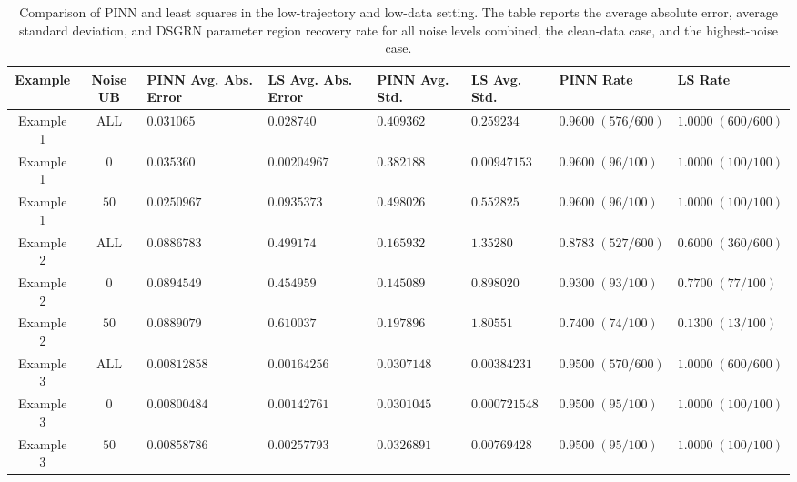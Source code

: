 \documentclass[11pt]{article}
\begin{document}
\begin{table}[H]
\centering
\scriptsize
\renewcommand{\arraystretch}{1.20}
\setlength{\tabcolsep}{3pt}
\begin{tabularx}{\textwidth}{|c|c|
>{\centering\arraybackslash}X|
>{\centering\arraybackslash}X|
>{\centering\arraybackslash}X|
>{\centering\arraybackslash}X|
>{\centering\arraybackslash}X|
>{\centering\arraybackslash}X|}
\hline
\textbf{Example} &
\textbf{Noise UB} &
\textbf{PINN Avg. Abs. Error} &
\textbf{LS Avg. Abs. Error} &
\textbf{PINN Avg. Std.} &
\textbf{LS Avg. Std.} &
\textbf{PINN Rate} &
\textbf{LS Rate} \\
\hline

Example 1 & ALL
& \(0.031065\) & \(0.028740\)
& \(0.409362\) & \(0.259234\)
& \(0.9600\; (576/600)\) & \(1.0000\; (600/600)\) \\
\hline
Example 1 & \(0\)
& \(0.035360\) & \(0.00204967\)
& \(0.382188\) & \(0.00947153\)
& \(0.9600\; (96/100)\) & \(1.0000\; (100/100)\) \\
\hline
Example 1 & \(50\)
& \(0.0250967\) & \(0.0935373\)
& \(0.498026\) & \(0.552825\)
& \(0.9600\; (96/100)\) & \(1.0000\; (100/100)\) \\
\hline

Example 2 & ALL
& \(0.0886783\) & \(0.499174\)
& \(0.165932\) & \(1.35280\)
& \(0.8783\; (527/600)\) & \(0.6000\; (360/600)\) \\
\hline
Example 2 & \(0\)
& \(0.0894549\) & \(0.454959\)
& \(0.145089\) & \(0.898020\)
& \(0.9300\; (93/100)\) & \(0.7700\; (77/100)\) \\
\hline
Example 2 & \(50\)
& \(0.0889079\) & \(0.610037\)
& \(0.197896\) & \(1.80551\)
& \(0.7400\; (74/100)\) & \(0.1300\; (13/100)\) \\
\hline

Example 3 & ALL
& \(0.00812858\) & \(0.00164256\)
& \(0.0307148\) & \(0.00384231\)
& \(0.9500\; (570/600)\) & \(1.0000\; (600/600)\) \\
\hline
Example 3 & \(0\)
& \(0.00800484\) & \(0.00142761\)
& \(0.0301045\) & \(0.000721548\)
& \(0.9500\; (95/100)\) & \(1.0000\; (100/100)\) \\
\hline
Example 3 & \(50\)
& \(0.00858786\) & \(0.00257793\)
& \(0.0326891\) & \(0.00769428\)
& \(0.9500\; (95/100)\) & \(1.0000\; (100/100)\) \\
\hline

\end{tabularx}
\caption{Comparison of PINN and least squares in the low-trajectory and low-data setting. The table reports the average absolute error, average standard deviation, and DSGRN parameter region recovery rate for all noise levels combined, the clean-data case, and the highest-noise case.}
\label{tab:low-traj-low-data-comparison}
\end{table}
\end{document}
